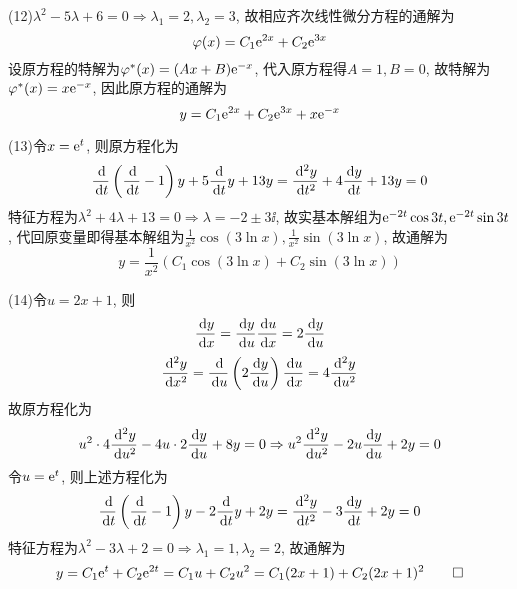 \begin{solve}
(12)$\lambda^2-5\lambda+6=0\Rightarrow\lambda_1=2,\lambda_2=3$, 故相应齐次线性微分方程的通解为
\[\varphi(x)=C_1\mathrm{e}^{2x}+C_2\mathrm{e}^{3x}\]
设原方程的特解为$\varphi^*(x)=(Ax+B)\mathrm{e}^{-x}$, 代入原方程得$A=1,B=0$, 
故特解为$\varphi^*(x)=x\mathrm{e}^{-x}$, 因此原方程的通解为
\[y=C_1\mathrm{e}^{2x}+C_2\mathrm{e}^{3x}+x\mathrm{e}^{-x}\]

(13)令$x=\mathrm{e}^t$, 则原方程化为
\[\frac{\,\mathrm{d}}{\,\mathrm{d} t}\left(\frac{\,\mathrm{d}}{\,\mathrm{d} t}-1\right)y+5\frac{\,\mathrm{d}}{\,\mathrm{d} t}y+13y=\frac{\,\mathrm{d}^2y}{\,\mathrm{d} t^2}+4\frac{\,\mathrm{d} y}{\,\mathrm{d} t}+13y=0\]
特征方程为$\lambda^2+4\lambda+13=0\Rightarrow\lambda=-2\pm3\ii$, 故实基本解组为$\mathrm{e}^{-2t}\cos3t,\mathrm{e}^{-2t}\sin3t$, 代回原变量即得基本解组为$\frac{1}{x^2}\cos(3\ln x),\frac{1}{x^2}\sin(3\ln x)$, 故通解为
\[y=\frac{1}{x^2}(C_1\cos(3\ln x)+C_2\sin(3\ln x))\]

(14)令$u=2x+1$, 则
\[\frac{\,\mathrm{d} y}{\,\mathrm{d} x}=\frac{\,\mathrm{d} y}{\,\mathrm{d} u}\frac{\,\mathrm{d} u}{\,\mathrm{d} x}=2\frac{\,\mathrm{d} y}{\,\mathrm{d} u}\]
\[\frac{\,\mathrm{d}^2y}{\,\mathrm{d} x^2}=\frac{\,\mathrm{d}}{\,\mathrm{d} u}\left(2\frac{\,\mathrm{d} y}{\,\mathrm{d} u}\right)\frac{\,\mathrm{d} u}{\,\mathrm{d} x}=4\frac{\,\mathrm{d}^2y}{\,\mathrm{d} u^2}\]
故原方程化为\[u^2\cdot4\frac{\,\mathrm{d}^2y}{\,\mathrm{d} u^2}-4u\cdot2\frac{\,\mathrm{d} y}{\,\mathrm{d} u}+8y=0\Rightarrow u^2\frac{\,\mathrm{d}^2y}{\,\mathrm{d} u^2}-2u\frac{\,\mathrm{d} y}{\,\mathrm{d} u}+2y=0\]
令$u=\mathrm{e}^t$, 则上述方程化为
\[\frac{\,\mathrm{d}}{\,\mathrm{d} t}\left(\frac{\,\mathrm{d}}{\,\mathrm{d} t}-1\right)y-2\frac{\,\mathrm{d}}{\,\mathrm{d} t}y+2y=\frac{\,\mathrm{d}^2y}{\,\mathrm{d} t^2}-3\frac{\,\mathrm{d} y}{\,\mathrm{d} t}+2y=0\]
特征方程为$\lambda^2-3\lambda+2=0\Rightarrow\lambda_1=1,\lambda_2=2$, 故通解为
\[y=C_1\mathrm{e}^t+C_2\mathrm{e}^{2t}=C_1u+C_2u^2=C_1(2x+1)+C_2(2x+1)^2\qedhere\]
\end{solve}